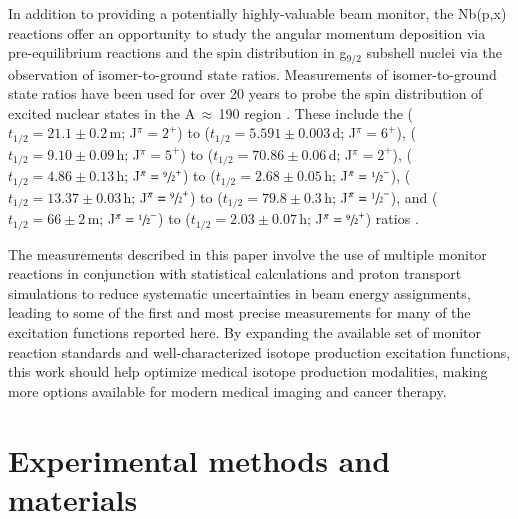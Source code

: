 \documentclass[3p]{elsarticle}
\newcommand{\comment}[1]{\todo[color=blue!20!white,inline]{ASV: #1}}
\begin{document}
%   

  
In addition to providing a potentially highly-valuable beam monitor, the Nb(p,x) reactions offer an opportunity to study the angular momentum deposition via pre-equilibrium reactions and the spin distribution in g$_{9/2}$ subshell nuclei via the observation of isomer-to-ground state ratios.  
Measurements of isomer-to-ground state ratios have been used for over 20 years to probe the spin distribution of excited nuclear states in the A\,$\approx$\,190 region \cite{PhysRevC.73.034613,PhysRevC.45.1171}.
These include the  ($t_{1/2}=21.1\pm0.2$\,m; J$^\pi=2^+$) to   ($t_{1/2}=5.591\pm0.003$\,d; J$^\pi=6^+$),  ($t_{1/2}=9.10\pm0.09$\,h; J$^\pi=5^+$) to   ($t_{1/2}=70.86\pm0.06$\,d; J$^\pi=2^+$),   ($t_{1/2}=4.86\pm0.13$\,h; J$^\pi=\sfrac{9}{2}^+$) to   ($t_{1/2}=2.68\pm0.05$\,h; J$^\pi=\sfrac{1}{2}^-$),   ($t_{1/2}=13.37\pm0.03$\,h; J$^\pi=\sfrac{9}{2}^+$) to   ($t_{1/2}=79.8\pm0.3$\,h; J$^\pi=\sfrac{1}{2}^-$),  and  ($t_{1/2}=66\pm2$\,m; J$^\pi=\sfrac{1}{2}^-$) to   ($t_{1/2}=2.03\pm0.07$\,h; J$^\pi=\sfrac{9}{2}^+$)  ratios \cite{Dong2015,Nesaraja2010,Singh2014,Johnson2015,Singh2013}.  
 
 
The measurements described in this paper involve the use of multiple monitor reactions in conjunction with statistical calculations and proton transport simulations to reduce systematic uncertainties in beam energy assignments, leading to some of the first and most precise measurements  for many of the excitation functions reported here. 
By expanding the available set of monitor reaction standards and well-characterized isotope production excitation functions, this work should help optimize medical isotope production modalities, making more options   available for modern medical imaging and cancer therapy.

 
 
 


\section{Experimental methods and materials}\label{sec:experiment}
\end{document}
